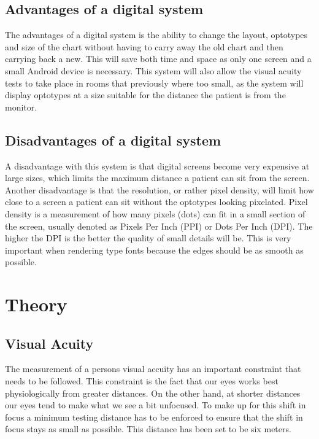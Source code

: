 \documentclass[12pt,a4paper,notitlepage]{report}
\begin{document}
\section{Advantages of a digital system}
The advantages of a digital system is the ability to change the layout, optotypes and size of the chart without having to carry away the old chart and then carrying back a new. This will save both time and space as only one screen and a small Android device is necessary. This system will also allow the visual acuity tests to take place in rooms that previously where too small, as the system will display optotypes at a size suitable for the distance the patient is from the monitor.

\section{Disadvantages of a digital system}
A disadvantage with this system is that digital screens become very expensive at large sizes, which limits the maximum distance a patient can sit from the screen. Another disadvantage is that the resolution, or rather pixel density, will limit how close to a screen a patient can sit without the optotypes looking pixelated. Pixel density is a measurement of how many pixels (dots) can fit in a small section of the screen, usually denoted as Pixels Per Inch (PPI) or Dots Per Inch (DPI). The higher the DPI is the better the quality of small details will be. This is very important when rendering type fonts because the edges should be as smooth as possible.

\chapter{Theory}
\section{Visual Acuity}
The measurement of a persons visual accuity has an important constraint that needs to be followed. This constraint is the fact that our eyes works best physiologically from greater distances. On the other hand, at shorter distances our eyes tend to make what we see a bit unfocused. To make up for this shift in focus a minimum testing distance has to be enforced to ensure that the shift in focus stays as small as possible. This distance has been set to be six meters.
\end{document}
